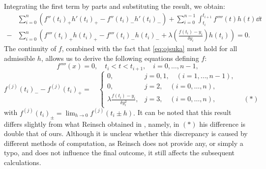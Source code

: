 \documentclass[11pt,leqno]{book}
\theoremstyle{definition}
\theoremstyle{plain}
\theoremstyle{definition}
\begin{document}
{Integrating the first term by parts and substituting the result, we obtain:
\begin{equation}
\begin{split}
    &\sum_{i=0}^{n}\left(f''(t_i)_{+}h'(t_i)_{+}- f''(t_i)_{-}h'(t_i)_{-} \right)+
    \sum_{i=0}^{n-1}\int_{t_i}^{t_{i+1}}{f''''(t)h(t)\dd t}\\-
    &\sum_{i=0}^{n}\left(f'''(t_i)_{+}h(t_i)_{+}- f'''(t_i)_{-}h(t_i)_{-} +\lambda (\frac{f(t_i) - {y}_i}{{\delta}{y}_i})h(t_i)\right)=0.
\end{split}
\label{eq:ojsuka}
\end{equation}
The continuity of $f$, combined with the fact that \eqref{eq:ojsuka} must hold for all admissible $h$, allows us to derive the following equations defining $f$:
\[
f''''(x) = 0, \quad t_i < t < t_{i+1}, \quad i = 0, \dots, n-1,
\]
\begin{equation}
f^{(j)}(t_i)_- - f^{(j)}(t_i)_+ = \quad 
\begin{cases}
0, & j = 0,1, \quad (i = 1, \dots, n-1), \\
0, & j = 2, \quad (i = 0, \dots, n), \\
\lambda\frac{f(t_i) - {y}_i}{{\delta}{y}_i^2}, & j = 3, \quad (i = 0, \dots, n), \qquad \qquad (*)
\end{cases}
\label{eq:ept}
\end{equation}
with $f^{(j)}(t_i)_{\pm}=
\lim_{h \to 0}f^{(j)}(t_i\pm h).$
It can be noted that this result differs slightly from what Reinsch obtained in \cite{REINSCH1967}, namely, in $(*)$ his difference is double that of ours. Although it is unclear whether this discrepancy is caused by different methods of computation, as Reinsch does not provide any, or simply a typo, and does not influence the final outcome, it still affects the subsequent calculations.

}
\end{document}

